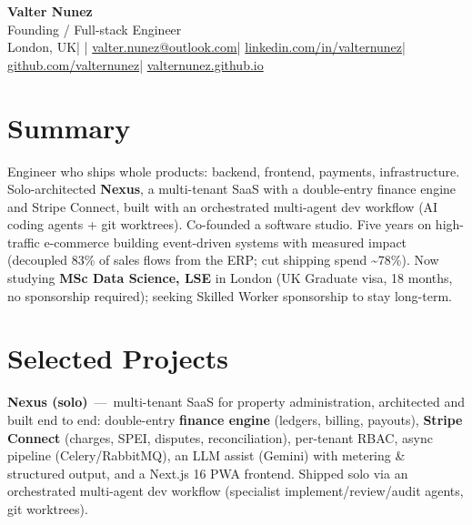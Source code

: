 \documentclass[10pt,a4paper]{article}
\newcommand{\project}[2]{\textbf{#1} \,---\, #2\par\vspace{1pt}}
\begin{document}
{\Huge\bfseries Valter Nunez}\\[3pt]
{\color{soft}\large Founding / Full-stack Engineer}\\[5pt]
{\footnotesize
London, UK\hspace{0.5em}\textcolor{soft}{|}\hspace{0.5em}%
\ifdefined\cvphone\href{tel:\cvphonetel}{\cvphone}\hspace{0.5em}\textcolor{soft}{|}\hspace{0.5em}\fi%
\href{mailto:valter.nunez@outlook.com}{valter.nunez@outlook.com}\hspace{0.5em}\textcolor{soft}{|}\hspace{0.5em}%
\href{https://www.linkedin.com/in/valternunez}{linkedin.com/in/valternunez}\hspace{0.5em}\textcolor{soft}{|}\hspace{0.5em}%
\href{https://github.com/valternunez}{github.com/valternunez}\hspace{0.5em}\textcolor{soft}{|}\hspace{0.5em}%
\href{https://valternunez.github.io}{valternunez.github.io}
}

\section*{Summary}
Engineer who ships whole products: backend, frontend, payments, infrastructure.
Solo-architected \textbf{Nexus}, a multi-tenant SaaS with a double-entry finance engine and Stripe
Connect, built with an orchestrated multi-agent dev workflow (AI coding agents + git worktrees).
Co-founded a software studio. Five years on high-traffic e-commerce building event-driven systems
with measured impact (decoupled 83\% of sales flows from the ERP; cut shipping spend
\textasciitilde78\%). Now studying \textbf{MSc Data Science, LSE} in London (UK Graduate visa, 18
months, no sponsorship required); seeking Skilled Worker sponsorship to stay long-term.

\section*{Selected Projects}
\begin{tight}
  \item \project{Nexus (solo)}{multi-tenant SaaS for property administration, architected and built end to end: double-entry \textbf{finance engine} (ledgers, billing, payouts), \textbf{Stripe Connect} (charges, SPEI, disputes, reconciliation), per-tenant RBAC, async pipeline (Celery/RabbitMQ), an LLM assist (Gemini) with metering \& structured output, and a Next.js 16 PWA frontend. Shipped solo via an orchestrated multi-agent dev workflow (specialist implement/review/audit agents, git worktrees).}
\end{tight}
\end{document}
